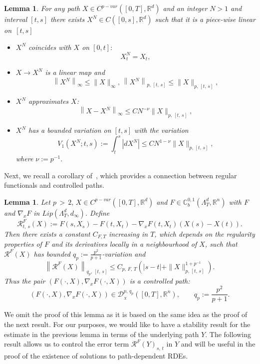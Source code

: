 \documentclass[10pt]{amsart}
\newtheorem{lemm}[theo]{Lemma}\newtheorem{prop}[theo]{Proposition}\newtheorem{coro}[theo]{Corollary}\newtheorem{conj}[theo]{Conjecture}
\theoremstyle{definition}\newtheorem{defi}[theo]{Definition}\newtheorem{rema}[theo]{Remark}\newtheorem{exam}[theo]{Example}\newtheorem{exem}[theo]{Example}\newtheorem{nota}[theo]{Notation}
\newcommand{\bbC}{\mathbb{C}}
\newcommand{\calD}{\mathcal{D}}
\newcommand{\calR}{\mathcal{R}}
\newcommand{\Rr}{{\mathbb{R}}}
\begin{document}
\begin{lemm}\label{chp2ilem:approxomega}
For any path $ X\in C^{p-var}([0,T],\Rr^d)$ and an integer $N>1$ and interval $[t,s]$ there exists $ X^N\in C([0,s], \Rr^d)$ such that it is a piece-wise linear on~$[t,s]$
\begin{itemize}
\item $ X^N$ coincides with $ X$ on $[0,t]:$
\[
X^N_t= X_t,
\]
\item $X\to X^N$ is a linear map and
\[
\left\|X^N\right\|_{\infty}\leq \|X\|_{\infty},\, \left\|X^N\right\|_{p,\,[t,\,s]}\leq \|X\|_{p,\,[t,\,s]},
\]
\item $ X^N$ approximates $X$:
\[
\left\| X-X^N\right\|_{\infty}\leq C N^{-\nu}\|X\|_{p,\, [t,\,s]},
\]

\item $ X^N$ has a bounded variation on $[t,s]$ with the variation
\[
V_1\left(X^N; t, s\right):= \int_t^s \left|dX^N\right|\leq C N^{1-\nu}\|X\|_{p,\,[t,\,s]},
\]
where $\nu:= p^{-1}.$
\end{itemize}
\end{lemm}

Next, we recall a corollary of~\cite[Theorem~5.12]{Anna}, which provides a connection between regular functionals and controlled paths.

\begin{lemm}\label{chp3theorem:controll}
Let ${p\,>\,2},\, X\in C^{p-var}([0,T],\Rr^d)$ and $F\in \bbC^{0,1}_b(\Lambda^d_T,\Rr^n)$ with $F$ and $\nabla_{{x}} F$ in $Lip(\Lambda^d_T, d_{\infty})$.
Define
\begin{equation}\label{chp2ieq:controlledpath}
\calR^{F}_{t,\,s}(X):=F\left(s, X_s\right)-F\left(t, X_t\right)-\nabla_{x}F\left(t, X_{t}\right)\left(X(s)- X(t)\right).
\end{equation}
Then there exists a constant $C_{F,T}$ increasing in $T$, which depends on the regularity properties of $F$ and its derivatives locally in a neighbourhood of $X$, such that ${\calR}^{F}(X)$ has bounded $q_p:=\frac {p^2} {p+1}$-variation and
\[
\left\|{\calR}^{F}(X)\right\|_{q_p,\,[t,\,s]}\leq C_{p,\,F,\, T}\left(|s-t|+\| X\|_{p, \,[t,\,s]}^{1+p^{-1}}\right).
\]
Thus the pair $(F(\cdot, X), \nabla_{{x}} F(\cdot, X))$ is a controlled path:
\[
\left(F(\cdot, X), \nabla_{{x}} F(\cdot, X)\right)\in \calD^{p,\,q_p}_{_X}\left([0,T], {\Rr^n}\right),\qquad q_p:=\frac {p^2} {p+1}.
\]
\end{lemm}

We omit the proof of this lemma as it is based on the same idea as the proof of the next result. For our purposes, we would like to have a stability result for the estimate in the previous lemma in terms of the underlying path $Y.$ The following result allows us to control the error term $\calR^{F}(Y)_{s,\,t}$ in $Y$ and will be useful in the proof of the existence of solutions to path-dependent RDEs.
\end{document}
